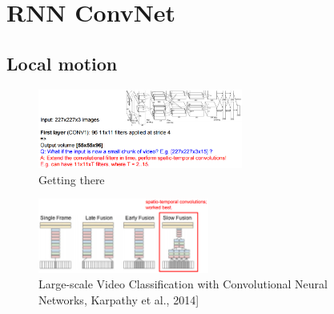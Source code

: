 \chapter{RNN ConvNet}
\section*{Local motion}
\begin{figure}[h]
  \centering
  \includegraphics[width=0.6\textwidth]{Images/rnn_convnet/1.png}
  \caption{Getting there}
\end{figure}
\begin{figure}[h]
  \centering
  \includegraphics[width=0.5\textwidth]{Images/rnn_convnet/2.png}
  \caption{Large-scale Video Classification with Convolutional Neural Networks, Karpathy et al., 2014]}
\end{figure}

